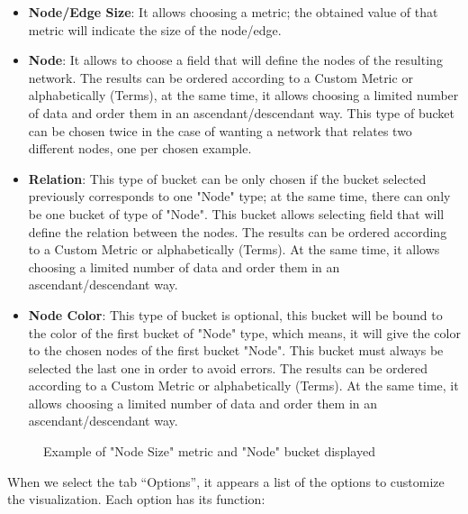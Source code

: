 \documentclass[a4paper, 12pt]{book}
\begin{document}
\begin{itemize}
\item \textbf{Node/Edge Size}: It allows choosing a metric; the obtained value of that metric will indicate the size of the node/edge.
\item \textbf{Node}: It allows to choose a field that will define the nodes of the resulting network. The results can be ordered according to a Custom Metric or alphabetically (Terms), at the same time, it allows choosing a limited number of data and order them in an ascendant/descendant way. This type of bucket can be chosen twice in the case of wanting a network that relates two different nodes, one per chosen example.
\item \textbf{Relation}: This type of bucket can be only chosen if the bucket selected previously corresponds to one "Node" type; at the same time, there can only be one bucket of type of "Node". This bucket allows selecting field that will define the relation between the nodes. The results can be ordered according to a Custom Metric or alphabetically (Terms). At the same time, it allows choosing a limited number of data and order them in an ascendant/descendant way.
\item \textbf{Node Color}: This type of bucket is optional, this bucket will be bound to the color of the first bucket of "Node" type, which means, it will give the color to the chosen nodes of the first bucket "Node". This bucket must always be selected the last one in order to avoid errors. The results can be ordered according to a Custom Metric or alphabetically (Terms). At the same time, it allows choosing a limited number of data and order them in an ascendant/descendant way. 
\end{itemize}

\begin{figure}[H]
 \centering
 \caption{Example of "Node Size" metric and "Node" bucket displayed}
 \label{f:metricbucketdisplayed}
\end{figure}

When we select the tab “Options”, it appears a list of the options to customize the visualization. Each option has its function: 
\end{document}
